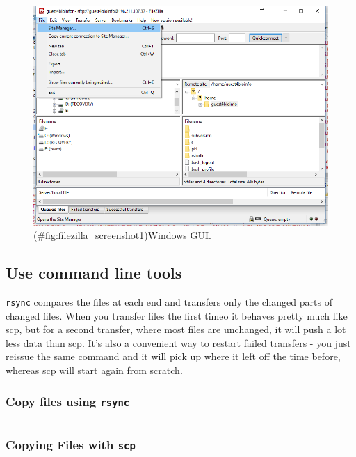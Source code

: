 \documentclass[]{book}
\theoremstyle{definition}
\theoremstyle{definition}
\theoremstyle{definition}
\theoremstyle{remark}
\begin{document}
\begin{figure}
\centering
\includegraphics{figures/filezilla_screenshot1.png}
\caption{(\#fig:filezilla\_screenshot1)Windows GUI.}
\end{figure}

\subsection{Use command line tools}\label{use-command-line-tools}

\texttt{rsync} compares the files at each end and transfers only the
changed parts of changed files. When you transfer files the first timeo
it behaves pretty much like scp, but for a second transfer, where most
files are unchanged, it will push a lot less data than scp. It's also a
convenient way to restart failed transfers - you just reissue the same
command and it will pick up where it left off the time before, whereas
scp will start again from scratch.

\subsubsection{\texorpdfstring{Copy files using
\texttt{rsync}}{Copy files using rsync}}\label{copy-files-using-rsync}

\begin{verbatim}
\end{verbatim}

\subsubsection{\texorpdfstring{Copying Files with
\texttt{scp}}{Copying Files with scp}}\label{copying-files-with-scp}
\end{document}
